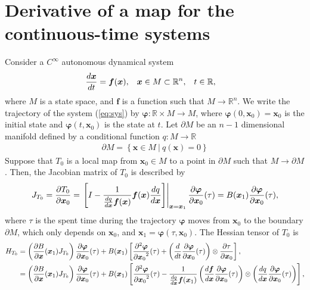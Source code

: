 \documentclass[a4paper]{article}
\newcommand{\R}{\mathbb{R}}
\newcommand{\deriv}[3][1]{%
    \ifthenelse{\equal{#1}{1}}{\frac{d #2}{d #3}}{\frac{d^#1 #2}{{d #3}^#1}}
}
\newcommand{\pderiv}[3][1]{%
    \ifthenelse{\equal{#1}{1}}{\frac{\partial #2}{\partial #3}}{\frac{\partial^#1 #2}{{\partial #3}^#1}}
}
\newcommand{\jac}{J}
\newcommand{\hes}{H}
\newcommand{\parens}[1]{\left(#1\right)}
\newcommand{\braces}[1]{\left\{#1\right\}}
\newcommand{\set}[1]{\braces{#1}}
\newcommand{\parm}{\partial\!M}
\newcommand{\brackets}[1]{\left[#1\right]}
\newcommand{\traj}{\bm \varphi}
\begin{document}
\section{Derivative of a map for the continuous-time systems}
Consider a $C^{\infty}$ autonomous dynamical system
\begin{align}
    \begin{aligned}
        \deriv{\bm x}{t} &= \bm f(\bm x), &
        \bm x &\in M \subset \R^n, &
        t &\in \R,
    \end{aligned}
    \label{eq:sys}
\end{align}
where $M$ is a state space, and $\bm f$ is a function such that $M \to \R^n$.
We write the trajectory of the system (\ref{eq:sys}) by $\traj: \R \times M \to M$,
where $\traj(0, \bm x_0) = \bm x_0$ is the initial state
and $\traj(t, \bm x_0)$ is the state at $t$.
Let $\parm$ be an $n-1$ dimensional manifold defined by
a conditional function $q: M \to \R$
\begin{align}
    \parm = \set{
        \bm x \in M ~|~
        q(\bm x) = 0
    }
\end{align}
Suppose that $T_0$ is a local map from $\bm x_0 \in M$ to a point in $\parm$
such that $M \to \parm$.
Then, the Jacobian matrix of $T_0$ is described by
\begin{align}
    \jac_{T_0} = \pderiv{T_0}{\bm x_0} =
    \left.
    \brackets{
        I -
        \frac{1}{\deriv{q}{\bm x} \bm f(\bm x)}
        \bm f(\bm x) \deriv{q}{\bm x}
    }
    \right|_{\bm x = \bm x_1}
    \pderiv{\traj}{\bm x_0}(\tau)
    =
    B(\bm x_1) \pderiv{\traj}{\bm x_0}(\tau),
\end{align}
where $\tau$ is the spent time during the trajectory $\traj$
moves from $\bm x_0$ to the boundary $\parm$, which only depends on $\bm x_0$,
and $\bm x_1 = \traj(\tau, \bm x_0)$.
The Hessian tensor of $T_0$ is
\begin{align}
    \begin{aligned}
        \hes_{T_0}
        &=
        \parens{\pderiv{B}{\bm x}(\bm x_1) \jac_{T_0}}\pderiv{\traj}{\bm x_0}(\tau)
        +
        B(\bm x_1)\brackets{
            \pderiv[2]{\traj}{\bm x_0}(\tau)
            +
            \parens{\deriv{}{t} \pderiv{\traj}{\bm x_0}(\tau)} \otimes \pderiv{\tau}{\bm x_0}
        },
        \\
        &=
        \parens{\pderiv{B}{\bm x}(\bm x_1) \jac_{T_0}}\pderiv{\traj}{\bm x_0}(\tau)
        +
        B(\bm x_1)\brackets{
            \pderiv[2]{\traj}{\bm x_0}(\tau)
            -\frac{1}{\deriv{q}{\bm x}\bm f(\bm x_1)}
            \parens{\deriv{\bm f}{\bm x}\pderiv{\traj}{\bm x_0}(\tau)} \otimes
            \parens{\deriv{q}{\bm x} \pderiv{\traj}{\bm x_0}(\tau)}
        },
    \end{aligned}
\end{align}
\end{document}

